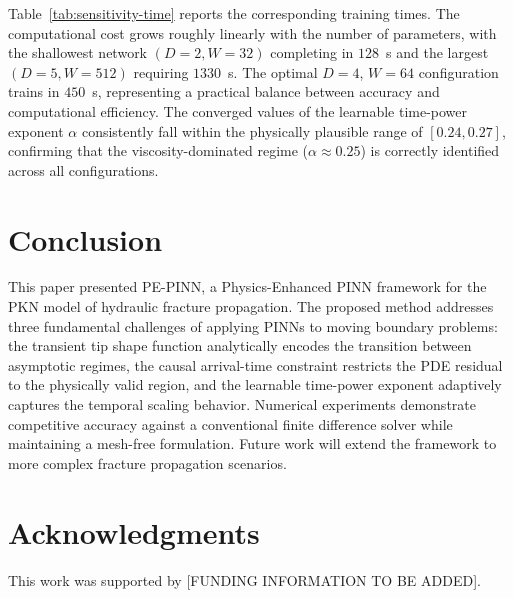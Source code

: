 \documentclass[a4paper,fleqn]{cas-sc}
\begin{document}
Table~\ref{tab:sensitivity-time} reports the corresponding training
times. The computational cost grows roughly linearly with the number
of parameters, with the shallowest network $(D=2, W=32)$ completing in
$128$~s and the largest $(D=5, W=512)$ requiring $1330$~s. The optimal
$D=4$, $W=64$ configuration trains in $450$~s, representing a practical
balance between accuracy and computational efficiency. The converged
values of the learnable time-power exponent $\alpha$ consistently fall
within the physically plausible range of $[0.24, 0.27]$, confirming
that the viscosity-dominated regime ($\alpha \approx 0.25$) is correctly
identified across all configurations.

\section{Conclusion}\label{sec:conclusion}

This paper presented PE-PINN, a Physics-Enhanced PINN framework for the PKN
model of hydraulic fracture propagation. The proposed method addresses
three fundamental challenges of applying PINNs to moving boundary
problems: the transient tip shape function analytically encodes the
transition between asymptotic regimes, the causal arrival-time
constraint restricts the PDE residual to the physically valid region,
and the learnable time-power exponent adaptively captures the temporal
scaling behavior. Numerical experiments demonstrate competitive
accuracy against a conventional finite difference solver while
maintaining a mesh-free formulation. Future work will extend the
framework to more complex fracture propagation scenarios.

\section*{Acknowledgments}

This work was supported by [FUNDING INFORMATION TO BE ADDED].

\printcredits




\end{document}
